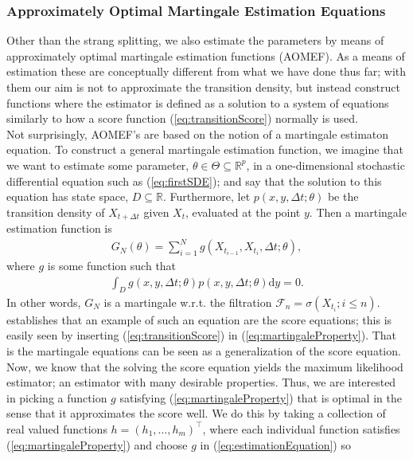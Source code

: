 \subsubsection{Approximately Optimal Martingale Estimation Equations}\label{subsubsec:approximatelyOptimalMartingaleEstimationEquation}
Other than the strang splitting, we also estimate the parameters by means of approximately optimal martingale estimation functions (AOMEF). As a means of estimation these are conceptually different from what we have done thus far; with them our aim is not to approximate the transition density, but instead construct functions where the estimator is defined as a solution to a system of equations similarly to how a score function (\ref{eq:transitionScore}) normally is used.\\ Not surprisingly, AOMEF's are based on the notion of a martingale estimaton equation. To construct a general martingale estimation function, we imagine that we want to estimate some parameter, $\theta\in \Theta \subseteq \mathbb{R}^p$, in a one-dimensional stochastic differential equation such as (\ref{eq:firstSDE}); and say that the solution to this equation has state space, $D\subseteq \mathbb{R}$. Furthermore, let $p(x, y, \Delta t; \theta)$ be the transition density of $X_{t+\Delta t}$ given $X_t$, evaluated at the point $y$. Then a martingale estimation function is 
\begin{align}
    G_N(\theta) = \sum_{i = 1}^N g(X_{t_{i - 1}}, X_{t_i}, \Delta t; \theta), \label{eq:estimationEquation}
\end{align}
where $g$ is some function such that
\begin{align}
    \int_{D} g(x, y, \Delta t; \theta)p(x, y, \Delta t; \theta)\mathrm{d}y = 0. \label{eq:martingaleProperty}
\end{align}
In other words, $G_N$ is a martingale w.r.t. the filtration $\mathcal{F}_n = \sigma\left(X_{t_i}; i \leq n\right)$. \cite[p. 11]{StatisticalMethodsForSDE} establishes that an example of such an equation are the score equations; this is easily seen by inserting (\ref{eq:transitionScore}) in (\ref{eq:martingaleProperty}). That is the martingale equations can be seen as a generalization of the score equation. Now, we know that the solving the score equation yields the maximum likelihood estimator; an estimator with many desirable properties. Thus, we are interested in picking a function $g$ satisfying (\ref{eq:martingaleProperty}) that is optimal in the sense that it approximates the score well. We do this by taking a collection of real valued functions $h = (h_1, \dots, h_m)^\top$, where each individual function satisfies (\ref{eq:martingaleProperty}) and choose $g$ in (\ref{eq:estimationEquation}) so
